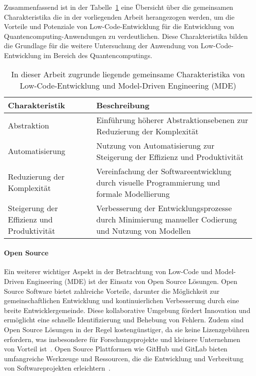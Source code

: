 Zusammenfassend ist in der Tabelle~\ref{tab:common_characteristics} eine Übersicht über die gemeinsamen Charakteristika die 
in der vorliegenden Arbeit herangezogen werden, um die Vorteile und Potenziale von Low-Code-Entwicklung 
für die Entwicklung von Quantencomputing-Anwendungen zu verdeutlichen. Diese Charakteristika bilden die Grundlage für die 
weitere Untersuchung der Anwendung von Low-Code-Entwicklung im Bereich des Quantencomputings. 

\begin{table}[h!]
    \centering
    \begin{tabular}{|p{5cm}|p{9cm}|}
    \hline
    \textbf{Charakteristik} & \textbf{Beschreibung} \\
    \hline
    Abstraktion & Einführung höherer Abstraktionsebenen zur Reduzierung der Komplexität \\
    \hline
    Automatisierung & Nutzung von Automatisierung zur Steigerung der Effizienz und Produktivität \\
    \hline
    Reduzierung der Komplexität & Vereinfachung der Softwareentwicklung durch visuelle Programmierung und formale Modellierung \\
    \hline
    Steigerung der Effizienz und Produktivität & Verbesserung der Entwicklungsprozesse durch Minimierung manueller Codierung und Nutzung von Modellen \\
    \hline
    \end{tabular}
    \caption{In dieser Arbeit zugrunde liegende gemeinsame Charakteristika von Low-Code-Entwicklung und Model-Driven Engineering (MDE)}
    \label{tab:common_characteristics}
\end{table}


\paragraph{Open Source}
Ein weiterer wichtiger Aspekt in der Betrachtung von Low-Code und Model-Driven Engineering (MDE) ist der 
Einsatz von Open Source Lösungen. Open Source Software bietet zahlreiche Vorteile, darunter die Möglichkeit 
zur gemeinschaftlichen Entwicklung und kontinuierlichen Verbesserung durch eine breite Entwicklergemeinde. 
Diese kollaborative Umgebung fördert Innovation und ermöglicht eine schnelle Identifizierung und Behebung 
von Fehlern. Zudem sind Open Source Lösungen in der Regel kostengünstiger, da sie keine Lizenzgebühren 
erfordern, was insbesondere für Forschungsprojekte und kleinere Unternehmen von Vorteil 
ist~\cite{raymond2010cathedral}. Open Source Plattformen wie GitHub und GitLab bieten umfangreiche Werkzeuge und 
Ressourcen, die die Entwicklung und Verbreitung von Softwareprojekten erleichtern~\cite{fitzgerald2006transformation}.


